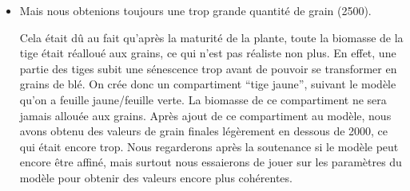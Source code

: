 \begin{itemize}
	\item Mais nous obtenions toujours une trop grande quantité de grain (2500). 

Cela était dû au fait qu'après la maturité de la plante, toute la biomasse de la tige était réalloué aux grains, ce qui n'est pas réaliste non plus. En effet, une partie des tiges subit une sénescence trop avant de pouvoir se transformer en grains de blé. On crée donc un compartiment ``tige jaune'', suivant le modèle qu'on a feuille jaune/feuille verte. La biomasse de ce compartiment ne sera jamais allouée aux grains.
Après ajout de ce compartiment au modèle, nous avons obtenu des valeurs de grain finales légèrement en dessous de 2000, ce qui était encore trop. 
Nous regarderons après la soutenance si le modèle peut encore être affiné, mais surtout nous essaierons de jouer sur les paramètres du modèle pour obtenir des valeurs encore plus cohérentes.


\end{itemize}

